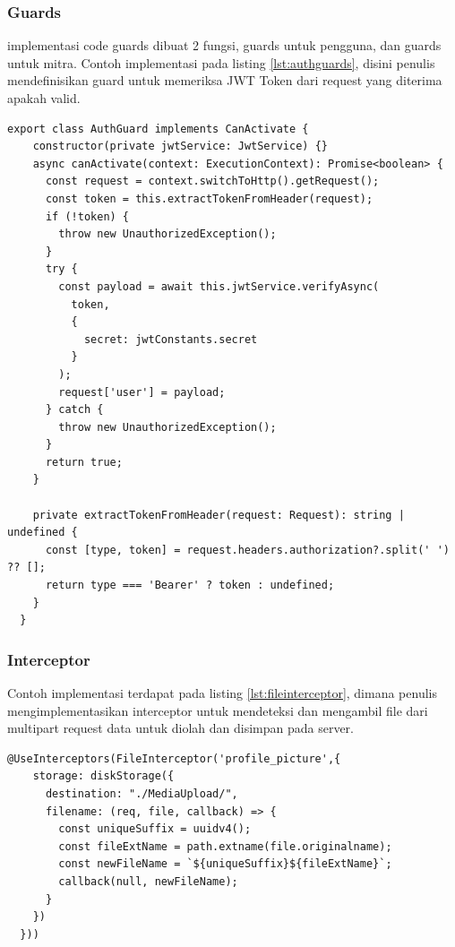 \subsubsection{Guards}
implementasi code guards dibuat 2 fungsi, guards untuk pengguna, dan guards untuk mitra. Contoh implementasi pada listing \ref{lst:authguards}, disini penulis mendefinisikan guard untuk memeriksa JWT Token dari request yang diterima apakah valid.
\begin{lstlisting}[caption={Authentication Guards}, label={lst:authguards}]
  export class AuthGuard implements CanActivate {
    constructor(private jwtService: JwtService) {}
    async canActivate(context: ExecutionContext): Promise<boolean> {
      const request = context.switchToHttp().getRequest();
      const token = this.extractTokenFromHeader(request);
      if (!token) {
        throw new UnauthorizedException();
      }
      try {
        const payload = await this.jwtService.verifyAsync(
          token,
          {
            secret: jwtConstants.secret
          }
        );
        request['user'] = payload;
      } catch {
        throw new UnauthorizedException();
      }
      return true;
    }
  
    private extractTokenFromHeader(request: Request): string | undefined {
      const [type, token] = request.headers.authorization?.split(' ') ?? [];
      return type === 'Bearer' ? token : undefined;
    }
  }
\end{lstlisting}

\subsubsection{Interceptor}
Contoh implementasi terdapat pada listing \ref{lst:fileinterceptor}, dimana penulis mengimplementasikan interceptor untuk mendeteksi dan mengambil file dari multipart request data untuk diolah dan disimpan pada server.
\begin{lstlisting}[caption={File Interceptor},label={lst:fileinterceptor}]
  @UseInterceptors(FileInterceptor('profile_picture',{
    storage: diskStorage({
      destination: "./MediaUpload/",
      filename: (req, file, callback) => {
        const uniqueSuffix = uuidv4();
        const fileExtName = path.extname(file.originalname);
        const newFileName = `${uniqueSuffix}${fileExtName}`;
        callback(null, newFileName);
      }
    })
  }))
\end{lstlisting}

